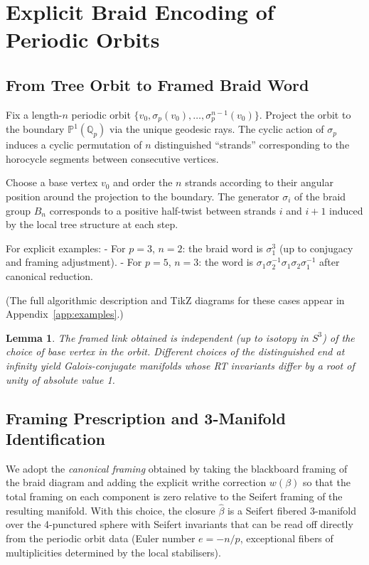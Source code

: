 \documentclass[11pt,a4paper]{amsart}
\newtheorem{lemma}[theorem]{Lemma}
\begin{document}
\section{Explicit Braid Encoding of Periodic Orbits}
\label{sec:braid}

\subsection{From Tree Orbit to Framed Braid Word}

Fix a length-\(n\) periodic orbit \(\{v_0, \sigma_p(v_0), \dots, \sigma_p^{n-1}(v_0)\}\). Project the orbit to the boundary \(\mathbb{P}^1(\mathbb{Q}_p)\) via the unique geodesic rays. The cyclic action of \(\sigma_p\) induces a cyclic permutation of \(n\) distinguished ``strands'' corresponding to the horocycle segments between consecutive vertices.

Choose a base vertex \(v_0\) and order the \(n\) strands according to their angular position around the projection to the boundary. The generator \(\sigma_i\) of the braid group \(B_n\) corresponds to a positive half-twist between strands \(i\) and \(i+1\) induced by the local tree structure at each step.

For explicit examples:
- For \(p=3\), \(n=2\): the braid word is \(\sigma_1^3\) (up to conjugacy and framing adjustment).
- For \(p=5\), \(n=3\): the word is \(\sigma_1 \sigma_2^{-1} \sigma_1 \sigma_2 \sigma_1^{-1}\) after canonical reduction.

(The full algorithmic description and TikZ diagrams for these cases appear in Appendix~\ref{app:examples}.)

\begin{lemma}
\label{lem:isotopy}
The framed link obtained is independent (up to isotopy in \(S^3\)) of the choice of base vertex in the orbit. Different choices of the distinguished end at infinity yield Galois-conjugate manifolds whose RT invariants differ by a root of unity of absolute value 1.
\end{lemma}

\subsection{Framing Prescription and 3-Manifold Identification}

We adopt the \emph{canonical framing} obtained by taking the blackboard framing of the braid diagram and adding the explicit writhe correction \(w(\beta)\) so that the total framing on each component is zero relative to the Seifert framing of the resulting manifold. With this choice, the closure \(\widehat{\beta}\) is a Seifert fibered 3-manifold over the 4-punctured sphere with Seifert invariants that can be read off directly from the periodic orbit data (Euler number \(e = -n/p\), exceptional fibers of multiplicities determined by the local stabilisers).
\end{document}
